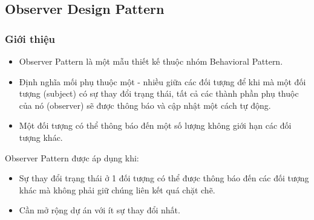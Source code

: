 \subsection{Observer Design Pattern}
\subsubsection{Giới thiệu}
\begin{itemize}
	\item Observer Pattern là một mẫu thiết kế thuộc nhóm Behavioral Pattern.
	\item Định nghĩa mối phụ thuộc một - nhiều giữa các đối tượng để khi mà một đối tượng (subject) có sự thay đổi trạng thái, tất cả các thành phần phụ thuộc của nó (observer) sẽ được thông báo và cập nhật một cách tự động.
	\item Một đối tượng có thể thông báo đến một số lượng không giới hạn các đối tượng khác.
\end{itemize}
\hspace*{0.5cm} Observer Pattern được áp dụng khi:
\begin{itemize}
	\item Sự thay đổi trạng thái ở 1 đối tượng có thể được thông báo đến các đối tượng khác mà không phải giữ chúng liên kết quá chặt chẽ.
	\item Cần mở rộng dự án với ít sự thay đổi nhất.
\end{itemize}
